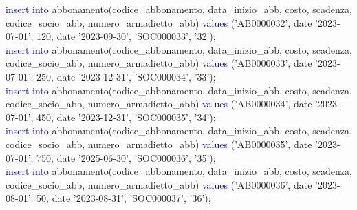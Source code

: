 \documentclass{article}
\begin{document}
\begin{flushleft}
{        \hspace*{0.5em}\textcolor{blue}{insert into} abbonamento(codice\_abbonamento, data\_inizio\_abb, costo, scadenza, \hspace*{0.5em}codice\_socio\_abb, numero\_armadietto\_abb) \textcolor{blue}{values} ('AB0000032', date '2023-07-01', \hspace*{0.5em}120, date '2023-09-30', 'SOC000033', '32'); \\
        \vspace{2mm}
        \hspace*{0.5em}\textcolor{blue}{insert into} abbonamento(codice\_abbonamento, data\_inizio\_abb, costo, scadenza, \hspace*{0.5em}codice\_socio\_abb, numero\_armadietto\_abb) \textcolor{blue}{values} ('AB0000033', date '2023-07-01', \hspace*{0.5em}250, date '2023-12-31', 'SOC000034', '33'); \\
        \vspace{2mm}
        \hspace*{0.5em}\textcolor{blue}{insert into} abbonamento(codice\_abbonamento, data\_inizio\_abb, costo, scadenza, \hspace*{0.5em}codice\_socio\_abb, numero\_armadietto\_abb) \textcolor{blue}{values} ('AB0000034', date '2023-07-01', \hspace*{0.5em}450, date '2023-12-31', 'SOC000035', '34'); \\
        \vspace{2mm}
        \hspace*{0.5em}\textcolor{blue}{insert into} abbonamento(codice\_abbonamento, data\_inizio\_abb, costo, scadenza, \hspace*{0.5em}codice\_socio\_abb, numero\_armadietto\_abb) \textcolor{blue}{values} ('AB0000035', date '2023-07-01', \hspace*{0.5em}750, date '2025-06-30', 'SOC000036', '35'); \\
        \vspace{2mm}
        \hspace*{0.5em}\textcolor{blue}{insert into} abbonamento(codice\_abbonamento, data\_inizio\_abb, costo, scadenza, \hspace*{0.5em}codice\_socio\_abb, numero\_armadietto\_abb) \textcolor{blue}{values} ('AB0000036', date '2023-08-01', \hspace*{0.5em}50, date '2023-08-31', 'SOC000037', '36'); \\
        \vspace{2mm}
}
\end{flushleft}
\end{document}
